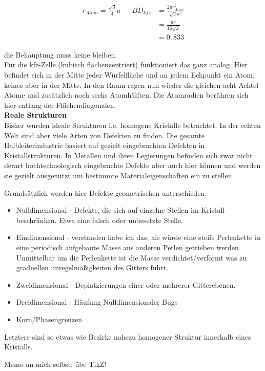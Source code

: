 \begin{align*}
    r_{Atom} = \frac{\sqrt{3}}{4}a && BD_{kfz}&=\frac{2\pi r_{Atom}^2}{\sqrt{2}a^2}\\
    && &=\frac{6\pi}{16\sqrt{2}}\\
    && &=0,833
\end{align*}

die Behauptung muss keine bleiben.\\

Für die kfz-Zelle (kubisch flächenzentriert) funktioniert das ganz analog. Hier befindet sich in der Mitte jeder Würfelfläche und an jedem Eckpunkt ein Atom, keines aber in der Mitte.
In den Raum ragen nun wieder die gleichen acht Achtel Atome und zusätzlich noch sechs Atomhälften. Die Atomradien berühren sich hier entlang der Flächendiagonalen.\\

\textbf{Reale Strukturen}\\
Bisher wurden ideale Strukturen i.e. homogene Kristalle betrachtet. In der echten Welt sind aber viele Arten von Defekten zu finden. Die gesamte Halbleiterindustrie basiert auf gezielt
eingebrachten Defekten in Kristallstrukturen. In Metallen und ihren Legierungen befinden sich zwar nicht derart hochtechnologisch eingebrachte Defekte aber auch hier können und werden sie
gezielt ausgenutzt um bestimmte Materialeigenschaften ein zu stellen.

Grundsätzlich werden hier Defekte geometrischen unterschieden.
\begin{itemize}
    \item Nulldimensional - Defekte, die sich auf einzelne Stellen im Kristall beschränken. Etwa eine falsch oder unbesetzte Stelle.
    \item Eindimensional - verstanden habe ich das, als würde eine steife Perlenkette in eine periodisch aufgebaute Masse aus anderen Perlen getrieben werden. Unmittelbar um die Perlenkette
    ist die Masse verdichtet/verformt was zu graduellen unregelmäßigkeiten des Gitters führt.
    \item Zweidimensional - Deplatzierungen einer oder mehrerer Gitterebenen.
    \item Dreidimensional - Häufung Nulldimensionaler Bugs
    \item Korn/Phasengrenzen
\end{itemize}

Letztere sind so etwas wie Bezirke nahezu homogener Struktur innerhalb eines Kristalls.

Memo an mich selbst: übe TikZ!